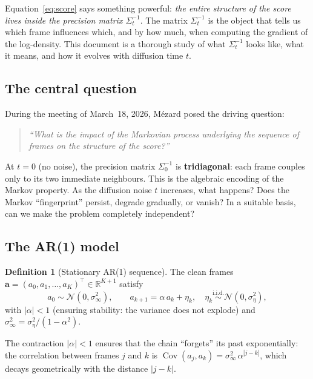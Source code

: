 \documentclass[11pt,a4paper]{article}
\theoremstyle{definition}
\newtheorem{definition}[theorem]{Definition}
\newcommand{\R}{\mathbb{R}}
\newcommand{\Cov}{\operatorname{Cov}}
\newcommand{\se}{\sigma_\eta^2}
\newcommand{\sinf}{\sigma_\infty^2}
\begin{document}
Equation~\eqref{eq:score} says something powerful: \emph{the entire structure of the score lives inside the precision matrix $\Sigma_t^{-1}$}.
The matrix $\Sigma_t^{-1}$ is the object that tells us which frame influences which, and by how much, when computing the gradient of the log-density.
This document is a thorough study of what $\Sigma_t^{-1}$ looks like, what it means, and how it evolves with diffusion time $t$.

\subsection{The central question}

During the meeting of March~18, 2026, M\'ezard posed the driving question:

\begin{quote}
\emph{``What is the impact of the Markovian process underlying the sequence of frames on the structure of the score?''}
\end{quote}

At $t=0$ (no noise), the precision matrix $\Sigma_0^{-1}$ is \textbf{tridiagonal}: each frame couples only to its two immediate neighbours.
This is the algebraic encoding of the Markov property.
As the diffusion noise $t$ increases, what happens?
Does the Markov ``fingerprint'' persist, degrade gradually, or vanish?
In a suitable basis, can we make the problem completely independent?

\subsection{The AR(1) model}

\begin{definition}[Stationary AR(1) sequence]\label{def:ar1}
The clean frames $\mathbf{a} = (a_0, a_1,\dots,a_K)^\top \in \R^{K+1}$ satisfy
\begin{equation}\label{eq:ar1}
  a_0 \sim \mathcal{N}(0, \sinf), \qquad
  a_{k+1} = \alpha\,a_k + \eta_k, \quad \eta_k \overset{\text{i.i.d.}}{\sim}\mathcal{N}(0,\se),
\end{equation}
with $|\alpha|<1$ (ensuring stability: the variance does not explode) and $\sinf = \se/(1-\alpha^2)$.

The contraction $|\alpha|<1$ ensures that the chain ``forgets'' its past exponentially: the correlation between frames $j$ and $k$ is $\Cov(a_j,a_k) = \sinf\,\alpha^{|j-k|}$, which decays geometrically with the distance $|j-k|$.
\end{definition}
\end{document}

